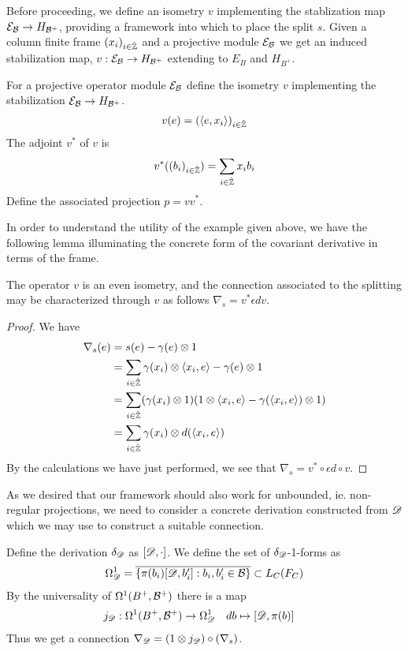 Before proceeding, we define an isometry $v$ implementing the stablization map $\mathcal{E}_{\mathcal{B}} \to H_{\mathcal{B}^+}$, providing a framework into which to place the split $s$. 	Given a column finite frame $(x_i)_{i\in \hat{\mathbb{Z}}}$ and a projective module $\mathcal{E}_{\mathcal{B}}$ we get an induced stabilization map, $v:\mathcal{E}_{\mathcal{B}}\to H_{\mathcal{B}^+}$ extending to $E_B$ and $H_{B^+}$. 
\begin{definition}
	For a projective operator module $\mathcal{E}_{\mathcal{B}}$ define the isometry $v$ implementing the stabilization $\mathcal{E}_{\mathcal{B}}\to H_{\mathcal{B}^+}$. 
	\begin{align*}
		v(e)=(\left \langle e,x_i \right \rangle)_{i\in \hat{\mathbb{Z}}}
	\end{align*}
	The adjoint $v^*$ of $v$ is 
	\begin{align*}
		v^*((b_i)_{i\in \hat{\mathbb{Z}}})=\sum_{i \in \hat{\mathbb{Z}}} x_i b_i
	\end{align*}
	Define the associated projection $p=vv^*$. 
\end{definition}
In order to understand the utility of the example given above, we have the following lemma illuminating the concrete form of the covariant derivative in terms of the frame. 
\begin{lemma}
	The operator $v$ is an even isometry, and the connection associated to the splitting may be characterized through $v$ as follows $\nabla_s=v^*\epsilon dv$. 
\end{lemma}
\begin{proof}
	We have 
	\begin{align*}
		\nabla_s(e)&=s(e)-\gamma(e)\otimes 1\\
		&=\sum_{i\in \hat{\mathbb{Z}}} \gamma(x_i)\otimes \left \langle x_i,e \right \rangle-\gamma(e)\otimes 1 \\
		&=\sum_{i\in \hat{\mathbb{Z}}} (\gamma(x_i)\otimes 1)(1\otimes \left \langle x_i,e \right \rangle-\gamma(\left \langle x_i,e \right \rangle)\otimes 1) \\
		&=\sum_{i\in \hat{\mathbb{Z}}} \gamma(x_i)\otimes d(\left \langle x_i,e \right \rangle)
	\end{align*}
	By the calculations we have just performed, we see that $\nabla_s=v^*\circ \epsilon d \circ v$. 
\end{proof}
As we desired that our framework should also work for unbounded, ie. non-regular projections, we need to consider a concrete derivation constructed from $\mathscr{D}$ which we may use to construct a suitable connection. 
\begin{definition}
	Define the derivation $\delta_{\mathscr{D}}$ as $[\mathscr{D},\cdot]$. We define the set of $\delta_{\mathscr{D}}$-1-forms as 
	\begin{align*}
		\Omega^1_{\mathscr{D}}=\overline{\{\pi(b_i)[\mathscr{D},b_i']: b_i,b_i'\in \mathcal{B} \}}\subset L_C(F_C)
	\end{align*}
	By the universality of $\Omega^1(B^+,\mathcal{B}^+)$ there is a map 
	\begin{align*}
		&j_{\mathscr{D}}:\Omega^1(B^+,\mathcal{B}^+)\to \Omega^1_{\mathscr{D}} & 
		&db\mapsto [\mathscr{D},\pi(b)]
	\end{align*}
	Thus we get a connection $\nabla_{\mathscr{D}}=(1\otimes j_{\mathscr{D}}) \circ (\nabla_s)$. 
\end{definition}
